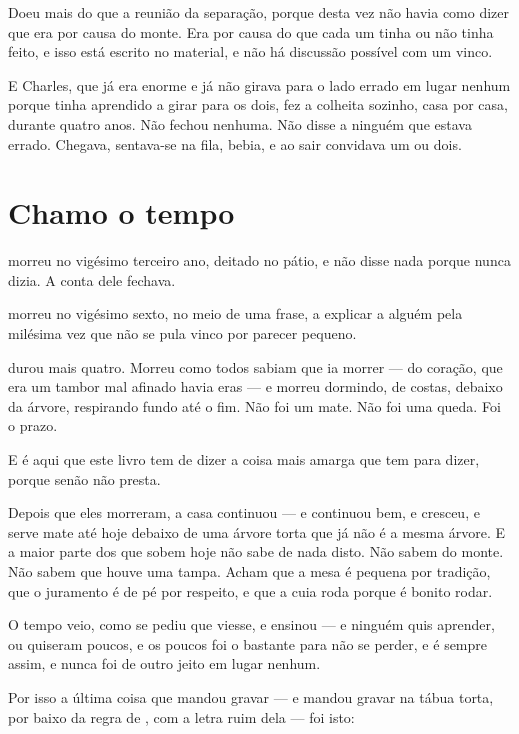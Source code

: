 \documentclass[livro.tex]{subfiles}
\begin{document}
\medskip

Doeu mais do que a reunião da separação, porque desta vez não havia como dizer que era por causa
do monte. Era por causa do que cada um tinha ou não tinha feito, e isso está escrito no material,
e não há discussão possível com um vinco.

E Charles, que já era enorme e já não girava para o lado errado em lugar nenhum porque tinha
aprendido a girar para os dois, fez a colheita sozinho, casa por casa, durante quatro anos. Não
fechou nenhuma. Não disse a ninguém que estava errado. Chegava, sentava-se na fila, bebia, e ao
sair convidava um ou dois.

\section{Chamo o tempo}

\Odo morreu no vigésimo terceiro ano, deitado no pátio, e não disse nada porque nunca dizia. A
conta dele fechava.

\Qui morreu no vigésimo sexto, no meio de uma frase, a explicar a alguém pela milésima vez que
não se pula vinco por parecer pequeno.

\Ven durou mais quatro. Morreu como todos sabiam que ia morrer --- do coração, que era um tambor
mal afinado havia eras --- e morreu dormindo, de costas, debaixo da árvore, respirando fundo até
o fim. Não foi um mate. Não foi uma queda. Foi o prazo.

\medskip

E é aqui que este livro tem de dizer a coisa mais amarga que tem para dizer, porque senão não
presta.

Depois que eles morreram, a casa continuou --- e continuou bem, e cresceu, e serve mate até hoje
debaixo de uma árvore torta que já não é a mesma árvore. E a maior parte dos que sobem hoje não
sabe de nada disto. Não sabem do monte. Não sabem que houve uma tampa. Acham que a mesa é
pequena por tradição, que o juramento é de pé por respeito, e que a cuia roda porque é bonito
rodar.

O tempo veio, como se pediu que viesse, e ensinou --- e ninguém quis aprender, ou quiseram poucos,
e os poucos foi o bastante para não se perder, e é sempre assim, e nunca foi de outro jeito em
lugar nenhum.

\medskip

Por isso a última coisa que \Qui mandou gravar --- e mandou gravar na tábua torta, por baixo da
regra de \Ven , com a letra ruim dela --- foi isto:
\end{document}
